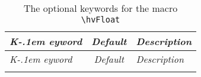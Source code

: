\documentclass[twoside,paper=a4,usegeometry,index=totoc]{scrartcl}
\def\nxLcs#1{\texttt{\textbackslash#1}}
\begin{document}
\begingroup
\small
  \def\rowvsp{\rule{0pt}{9pt}}%
  \def\rowhsp{\hspace*{\normalparindent}}%
  \def\rownl{\newline\rowhsp}%
  \def\none{{\itshape none}}%
  \def\arraystretch{0.96}%
\begin{xltabular}{\textwidth}{@{} l>{\small\ttfamily}cX @{}}
\caption{The optional keywords for the macro \nxLcs{hvFloat}}\label{tab:options}\\\toprule
\emph{K\kern-.1em eyword} & \rmfamily\emph{Default} & \emph{Description}\\\midrule
\endfirsthead
\midrule
\emph{K\kern-.1em eyword} & \rmfamily\emph{Default} & \emph{Description}\\\midrule
\endhead
\midrule
\endfoot
\bottomrule
\endlastfoot


\end{xltabular}
\end{document}
